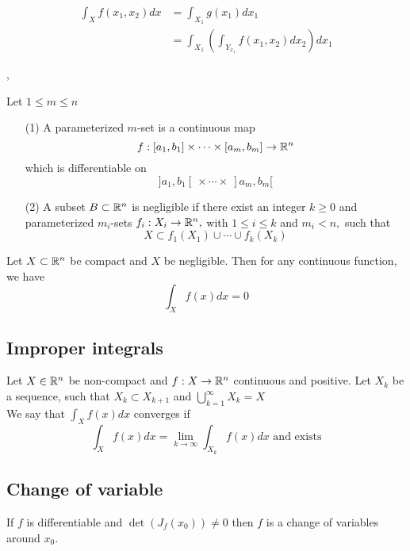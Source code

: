 \begin{align*}
\int_{X} f\left(x_{1}, x_{2}\right) d x &=\int_{X_{1}} g\left(x_{1}\right) d x_{1} \\
&=\int_{X_{1}}\left(\int_{Y_{x_{1}}} f\left(x_{1}, x_{2}\right) d x_{2}\right) d x_{1}
\end{align*}


\sep

 Let $1 \leqslant m \leqslant n$

\begin{enumerate}
\item[(1)] A parameterized $m$-set is a continuous map
$$
f:\left[a_{1}, b_{1}\right ] \times \cdots \times \left[a_{m}, b_{m}\right] \rightarrow \mathbb{R}^{n}
$$
which is differentiable on
$$
] a_{1}, b_{1}[ \ \times \cdots \times \ ] a_{m}, b_{m}[
$$

\item[(2)] A subset $B \subset \mathbb{R}^{n}$ is negligible if there exist an integer $k \geqslant 0$ and parameterized $m_{i}$-sets $f_{i}: X_{i} \rightarrow \mathbb{R}^{n},$ with $1 \leqslant i \leqslant k$ and $m_{i}<n,$ such that
$$
X \subset f_{1}\left(X_{1}\right) \cup \cdots \cup f_{k}\left(X_{k}\right)
$$
\end{enumerate} 

 Let $X \subset \mathbb{R}^n$ be compact and $X$ be negligible. Then for any continuous function, we have
\[ \int_X f(x) dx = 0 \]


\subsection{Improper integrals}

\Def [4.3.1] Let $X \in \mathbb{R}^n$ be non-compact and $f: X \rightarrow \mathbb{R}^n$ continuous and positive. Let $X_k$ be a sequence, such that $X_k \subset X_{k + 1}$ and $\bigcup\limits_{k = 1}^\infty X_k = X$ \\
We say that $\int_X f(x) dx$ converges if
\[\int_X f(x) dx = \lim \limits_{k \rightarrow \infty} \int_{X_k} f(x) dx \text{ and exists} \]


\subsection{Change of variable}

 If $f$ is differentiable and $\det(J_f(x_0)) \neq 0$ then $f$ is a change of variables around $x_0$. \\

